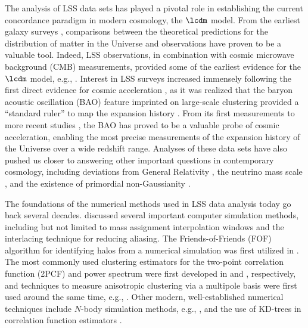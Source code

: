 The analysis of LSS data sets has played a pivotal role in
establishing the current concordance
paradigm in modern cosmology, the $\lcdm$ model. From the earliest galaxy
surveys \citep{Davis:1985, Maddox:1990}, comparisons between the theoretical
predictions for the distribution of matter in the Universe and observations
have proven to be a valuable tool.
Indeed, LSS observations, in combination with cosmic microwave
background (CMB) measurements, provided some of the earliest evidence for
the $\lcdm$ model, e.g., \citet{Efstathiou:1990, Krauss:1995, Ostriker:1995}.
Interest in LSS surveys increased immensely following the first direct
evidence for cosmic acceleration \citep{Riess:1998,Perlmutter:1999}, as it was
realized that the baryon acoustic oscillation (BAO) feature imprinted on
large-scale clustering provided a ``standard ruler'' to map the expansion history
\citep{Eisenstein:1998, Blake:2003, Seo:2003}. From its first measurements
\citep{Cole:2005, Eisenstein:2005} to more
recent studies \citep{Font-Ribera:2014, Delubac:2015, Alam:2017, Slepian:2017},
the BAO has proved to be a valuable probe of cosmic acceleration, enabling
the most precise measurements of the expansion history of the Universe
over a wide redshift range.
Analyses of these data sets have also pushed us closer to
answering other important questions in contemporary cosmology, including
deviations from General Relativity \citep{Mueller:2016},
the neutrino mass scale \citep{Lesgourgues:2006, Beutler:2014}, and
the existence of primordial non-Gaussianity
\citep{Slosar:2008, Desjacques:2010}.

The foundations of the numerical methods used in LSS data analysis today
go back several decades.
\citet{Hockney:1981} discussed several important computer simulation
methods, including but not limited to mass assignment interpolation windows
and the interlacing technique for reducing aliasing.
The Friends-of-Friends (FOF) algorithm for identifying halos from a
numerical simulation was first utilized in \citet{Davis:1985}.
The most commonly used clustering estimators for the
two-point correlation function (2PCF) and power spectrum were first
developed in \citet{Landy:1993} and \citet{Feldman:1994}, respectively,
and techniques to measure anisotropic clustering via a multipole basis
were first used around the same time, e.g., \citet{Cole:1995}.
Other modern, well-established numerical techniques include
$N$-body simulation methods, e.g., \citet{Springel:2001, Springel:2005},
and the use of KD-trees in correlation function estimators \citep{Moore:2001}.

